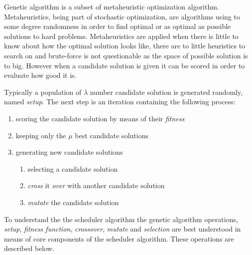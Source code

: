 Genetic algorithm is a subset of metaheuristic optimization algorithm. Metaheuristics, being part of stochastic optimization, are algorithms using to some degree randomness in order to find optimal or as optimal as possible solutions to hard problems. Metaheuristics are applied when there is little to know about how the optimal solution looks like, there are to little heuristics to search on and brute-force is not questionable as the space of possible solution is to big. However when a candidate solution is given it can be scored in order to evaluate how good it is.

Typically a population of $\lambda$ number candidate solution is generated randomly, named \emph{setup}. The next step is an iteration containing the following process:

\begin{enumerate}
\item scoring the candidate solution by means of their \emph{fitness}

\item keeping only the $\mu$ best candidate solutions

\item generating new candidate solutions

	\begin{enumerate}
	\item selecting a candidate solution
	\item \emph{cross} it \emph{over} with another candidate solution
	\item \emph{mutate} the candidate solution
	\end{enumerate}
\end{enumerate}

To understand the the scheduler algorithm the genetic algorithm operations, \emph{setup}, \emph{fitness function}, \emph{crossover}, \emph{mutate} and \emph{selection} are best understood in means of core components of the scheduler algorithm. These operations are described below.

